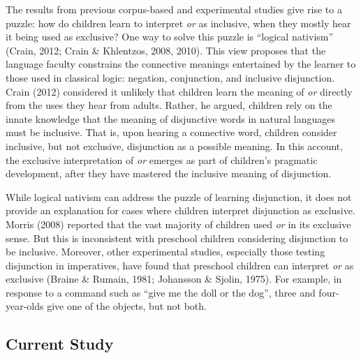 \documentclass[
  ,man,floatsintext]{apa6}
\begin{document}
The results from previous corpus-based and experimental studies give rise to a puzzle: how do children learn to interpret \emph{or} as inclusive, when they mostly hear it being used as exclusive? One way to solve this puzzle is ``logical nativism'' (Crain, 2012; Crain \& Khlentzos, 2008, 2010). This view proposes that the language faculty constrains the connective meanings entertained by the learner to those used in classical logic: negation, conjunction, and inclusive disjunction. Crain (2012) considered it unlikely that children learn the meaning of \emph{or} directly from the uses they hear from adults. Rather, he argued, children rely on the innate knowledge that the meaning of disjunctive words in natural languages must be inclusive. That is, upon hearing a connective word, children consider inclusive, but not exclusive, disjunction as a possible meaning. In this account, the exclusive interpretation of \emph{or} emerges as part of children's pragmatic development, after they have mastered the inclusive meaning of disjunction.

While logical nativism can address the puzzle of learning disjunction, it does not provide an explanation for cases where children interpret disjunction as exclusive. Morris (2008) reported that the vast majority of children used \emph{or} in its exclusive sense. But this is inconsistent with preschool children considering disjunction to be inclusive. Moreover, other experimental studies, especially those testing disjunction in imperatives, have found that preschool children can interpret \emph{or} as exclusive (Braine \& Rumain, 1981; Johansson \& Sjolin, 1975). For example, in response to a command such as ``give me the doll or the dog'', three and four-year-olds give one of the objects, but not both.

\hypertarget{current-study}{%
\subsection{Current Study}\label{current-study}}
\end{document}
